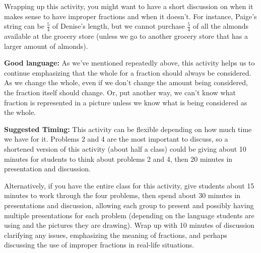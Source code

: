 \documentclass{ximera}
\begin{document}
\begin{instructorNotes}
Wrapping up this activity, you might want to have a short discussion on when it makes sense to have improper fractions and when it doesn't. For instance, Paige's string can be $\frac{5}{4}$ of Denise's length, but we cannot purchase $\frac{5}{4}$ of all the almonds available at the grocery store (unless we go to another grocery store that has a larger amount of almonds).

{\bf Good language:} As we've mentioned repeatedly above, this activity helps us to continue emphasizing that the whole for a fraction should always be considered.  As we change the whole, even if we don't change the amount being considered, the fraction itself should change.  Or, put another way, we can't know what fraction is represented in a picture unless we know what is being considered as the whole.


{\bf Suggested Timing:} This activity can be flexible depending on how much time we have for it. Problems 2 and 4 are the most important to discuss, so a shortened version of this activity (about half a class) could be giving about 10 minutes for students to think about problems 2 and 4, then 20 minutes in presentation and discussion.

Alternatively, if you have the entire class for this activity, give students about 15 minutes to work through the four problems, then spend about 30 minutes in presentations and discussion, allowing each group to present and possibly having multiple presentations for each problem (depending on the language students are using and the pictures they are drawing). Wrap up with 10 minutes of discussion clarifying any issues, emphasizing the meaning of fractions, and perhaps discussing the use of improper fractions in real-life situations.


\end{instructorNotes}
\end{document}
